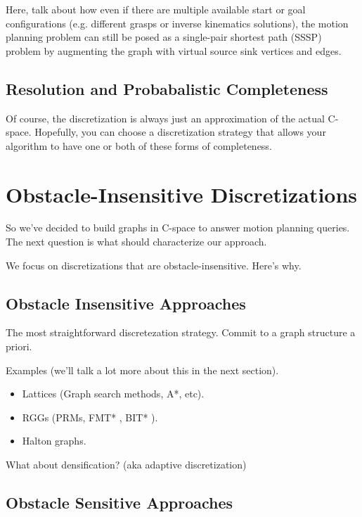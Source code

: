 Here, talk about how even if there are multiple available
start or goal configurations
(e.g. different grasps or inverse kinematics solutions),
the motion planning problem can still be posed as a
single-pair shortest path (SSSP) problem
by augmenting the graph with virtual source sink vertices
and edges.

\subsection{Resolution and Probabalistic Completeness}

Of course, the discretization is always just an approximation
of the actual C-space.
Hopefully, you can choose a discretization strategy that allows your
algorithm to have one or both of these forms of completeness.

\section{Obstacle-Insensitive Discretizations}

So we've decided to build graphs in C-space to answer motion planning
queries.
The next question is what should characterize our approach.

We focus on discretizations that are obstacle-insensitive.
Here's why.

\subsection{Obstacle Insensitive Approaches}

The most straightforward discretezation strategy.
Commit to a graph structure a priori.

Examples (we'll talk a lot more about this in the next section).
\begin{itemize}
\item Lattices (Graph search methods, A*, etc).
\item RGGs (PRMs, FMT* \citep{janson2015fmtstar},
   BIT* \citep{gammell2015bitstar}).
\item Halton graphs.
\end{itemize}

What about densification? (aka adaptive discretization)

\subsection{Obstacle Sensitive Approaches}

